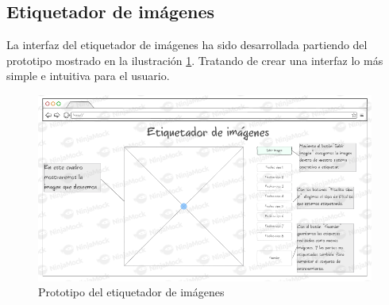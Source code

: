 \subsection{Etiquetador de imágenes}

La interfaz del etiquetador de imágenes ha sido desarrollada partiendo del prototipo mostrado en la ilustración \ref{fig:C.5.2}. Tratando de crear una interfaz lo más simple e intuitiva para el usuario.

\begin{figure}
\centering
\includegraphics[width=0.99\textwidth]{protototipo_etiquetador_de_imagenes}
\caption{Prototipo del etiquetador de imágenes}
\label{fig:C.5.2}
\end{figure}

